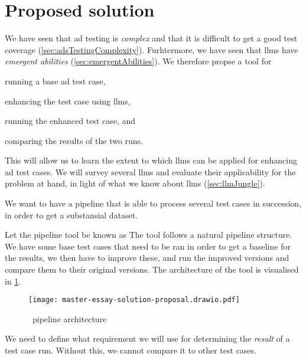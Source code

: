 \section{Proposed solution}\label{sec:solutionProposal}

We have seen that \acrshort{ad} testing is \textit{complex} and that it is difficult to get a good
test coverage (\cref{sec:adsTestingComplexity}). Furhtermore, we have seen that \acrshort{llms} have
\textit{emergent abilities} (\cref{sec:emergentAbilities}). We therefore propse a tool for
\begin{inparaenum}
    \item running a base \acrshort{ad} test case,
    \item enhancing the test case using \acrshort{llms},
    \item running the enhanced test case,
    and
    \item comparing the results of the two runs.
\end{inparaenum}

This will allow us to learn the extent to which \acrshort{llms} can be applied for enhancing
\acrlong{ad} test cases. We will survey several \acrshort{llms} and evaluate their applicability for
the problem at hand, in light of what we know about \acrshort{llms} (\cref{sec:llmJungle}).

We want to have a pipeline that is able to process several test cases in succession, in order to get
a substansial dataset.

Let the pipeline tool be known as \hefe%
The tool follows a natural pipeline structure. We have some base test cases that
need to be ran in order to get a baseline for the results, we then have to
improve these, and run the improved versions and compare them to their original
versions. The architecture of the tool is visualised in \cref{fig:hefeArch}.

\begin{figure}[h]
    \centering
    \texttt{[image: master-essay-solution-proposal.drawio.pdf]}
    \caption{\hefe~pipeline architecture}\label{fig:hefeArch}
\end{figure}

We need to define what requirement we will use for determining the \textit{result} of a test case
run. Without this, we cannot compare it to other test cases.

